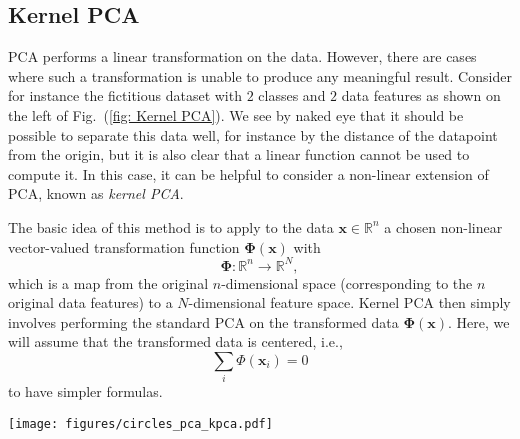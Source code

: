 \subsection{Kernel PCA}
PCA performs a linear transformation on the data. However, there are cases where such a transformation is unable to produce any meaningful result. Consider for instance the fictitious dataset with $2$ classes and $2$ data features as shown on the left of Fig.~(\ref{fig: Kernel PCA}). We see by naked eye that it should be possible to separate this data well, for instance by the distance of the datapoint from the origin, but it is also clear that a linear function cannot be used to compute it. In this case, it can be helpful to consider a non-linear extension of PCA, known as \textit{kernel PCA}.

The basic idea of this method is to apply to the data $\bm{x} \in \mathbb{R}^{n}$ a chosen non-linear vector-valued transformation function $\bm{\Phi}(\bm{x})$ with
\begin{equation}\label{eqn: kernel pca transformation}
    \bm{\Phi}: \mathbb{R}^{n} \rightarrow \mathbb{R}^{N},
\end{equation}
which is a map from the original $n$-dimensional space (corresponding to the $n$ original data features) to a $N$-dimensional feature space. Kernel PCA then simply involves performing the standard PCA on the transformed data $\bm{\Phi}(\bm{x})$. Here, we will assume that the transformed data is centered, i.e.,
\begin{equation}
\sum_i \Phi(\bm{x}_i) = 0
\end{equation}
to have simpler formulas.

\begin{figure*}[t]
    \texttt{[image: figures/circles\_pca\_kpca.pdf]}
    \caption{\textbf{Kernel PCA versus PCA.}}
\label{fig: Kernel PCA}
\end{figure*}

